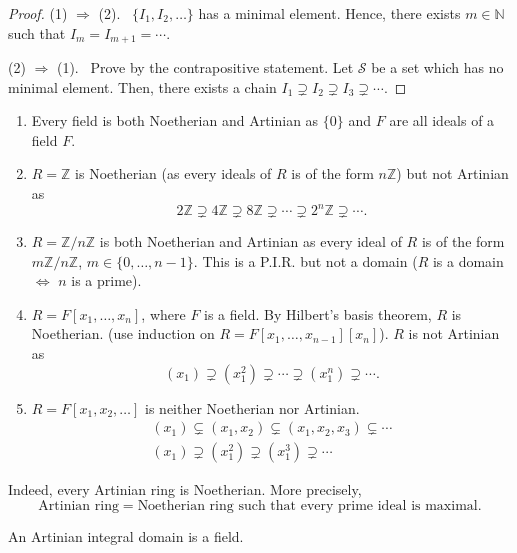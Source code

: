\documentclass[twoside]{article}
\newcommand\N{\mathbb N}
\newcommand\Z{\mathbb Z}
\theoremstyle{remark}
\newcounter{theorem}
\begin{document}
\begin{proof}
  (1) \(\Rightarrow\) (2). \ \(\{I_1, I_2, \dots\}\) has a minimal element. Hence, there exists \(m \in \N\) such that \(I_m = I_{m+1} = \cdots\).
  
  (2) \(\Rightarrow\) (1). \ Prove by the contrapositive statement. Let \(\mathcal S\) be a set which has no minimal element. Then, there exists a chain \(I_1 \supsetneq I_2 \supsetneq I_3 \supsetneq \cdots\).
\end{proof}

\begin{examples}
  \begin{enumerate}[label=\arabic*.]
    \item Every field is both Noetherian and Artinian as \(\{0\}\) and \(F\) are all ideals of a field \(F\).
    \item \(R = \Z\) is Noetherian (as every ideals of \(R\) is of the form \(n\Z\)) but not Artinian as
    \[ 2\Z \supsetneq 4\Z \supsetneq 8\Z \supsetneq \cdots \supsetneq 2^n\Z \supsetneq \cdots. \]
    \item \(R = \Z/n\Z\) is both Noetherian and Artinian as every ideal of \(R\) is of the form \(m\Z/n\Z\), \(m \in \{0, \dots, n-1\}\). This is a P.I.R. but not a domain (\(R\) is a domain \(\iff\) \(n\) is a prime).
    \item \(R = F[x_1, \dots, x_n]\), where \(F\) is a field. By Hilbert's basis theorem, \(R\) is Noetherian. (use induction on \(R = F[x_1, \dots, x_{n-1}][x_n]\)). \(R\) is not Artinian as
    \[ (x_1) \supsetneq (x_1^2) \supsetneq \cdots \supsetneq (x_1^n) \supsetneq \cdots. \]
    \item \(R = F[x_1, x_2, \dots]\) is neither Noetherian nor Artinian.
    \begin{gather*}
      (x_1) \subsetneq (x_1,x_2) \subsetneq (x_1,x_2,x_3) \subsetneq \cdots \\
      (x_1) \supsetneq (x_1^2) \supsetneq (x_1^3) \supsetneq \cdots
    \end{gather*}
  \end{enumerate}
\end{examples}

Indeed, every Artinian ring is Noetherian. More precisely,
\[ \text{Artinian ring} = \text{Noetherian ring such that every prime ideal is maximal}. \]

\begin{lemma}
  An Artinian integral domain is a field.
\end{lemma}
\end{document}
